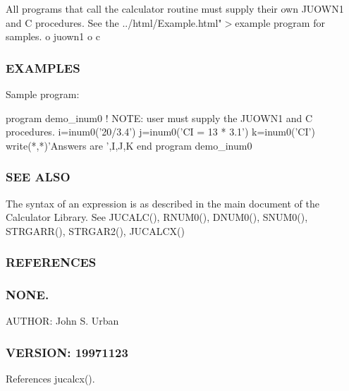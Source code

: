 All programs that call the calculator routine must supply their own J\+U\+O\+W\+N1 and C procedures. See the ../html/\+Example.html"$>$example program for samples. o juown1 o c \subsubsection*{E\+X\+A\+M\+P\+L\+ES}

\begin{DoxyVerb}Sample program:

   program demo_inum0
   ! NOTE: user must supply the JUOWN1 and C procedures.
   i=inum0('20/3.4')
   j=inum0('CI = 13 * 3.1')
   k=inum0('CI')
   write(*,*)'Answers are ',I,J,K
   end program demo_inum0
\end{DoxyVerb}


\subsubsection*{S\+EE A\+L\+SO}

The syntax of an expression is as described in the main document of the Calculator Library. See J\+U\+C\+A\+L\+C(), R\+N\+U\+M0(), D\+N\+U\+M0(), S\+N\+U\+M0(), S\+T\+R\+G\+A\+R\+R(), S\+T\+R\+G\+A\+R2(), J\+U\+C\+A\+L\+C\+X() \subsubsection*{R\+E\+F\+E\+R\+E\+N\+C\+ES}

\subsubsection*{N\+O\+NE.}

A\+U\+T\+H\+OR\+: John S. Urban \subsubsection*{V\+E\+R\+S\+I\+ON\+: 19971123}

References jucalcx().

